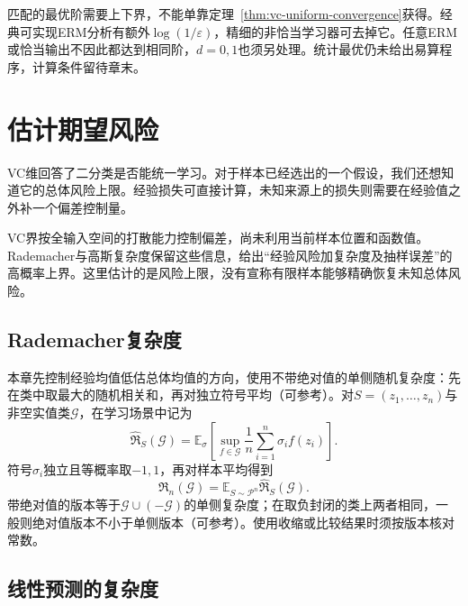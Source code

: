 匹配的最优阶需要上下界，不能单靠定理~\ref{thm:vc-uniform-convergence}获得。经典可实现ERM分析有额外$\log(1/\varepsilon)$，精细的非恰当学习器可去掉它。任意ERM或恰当输出不因此都达到相同阶，$d=0,1$也须另处理。统计最优仍未给出易算程序，计算条件留待章末。

\section{估计期望风险}
\label{sec:rademacher-complexity}

VC维回答了二分类是否能统一学习。对于样本已经选出的一个假设，我们还想知道它的总体风险上限。经验损失可直接计算，未知来源上的损失则需要在经验值之外补一个偏差控制量。

VC界按全输入空间的打散能力控制偏差，尚未利用当前样本位置和函数值。Rademacher与高斯复杂度保留这些信息，给出“经验风险加复杂度及抽样误差”的高概率上界。这里估计的是风险上限，没有宣称有限样本能够精确恢复未知总体风险。

\subsection{Rademacher复杂度}

本章先控制经验均值低估总体均值的方向，使用不带绝对值的单侧随机复杂度：先在类中取最大的随机相关和，再对独立符号平均（可参考）。对$S=(z_1,\ldots,z_n)$与非空实值类$\mathcal G$，在学习场景中记为
\begin{equation}
 \widehat{\mathfrak R}_S(\mathcal G)
 =\mathbb E_\sigma\left[\sup_{f\in\mathcal G}
       \frac1n\sum_{i=1}^n\sigma_i f(z_i)\right].
 \label{eq:learning-empirical-rademacher}
\end{equation}
符号$\sigma_i$独立且等概率取$-1,1$，再对样本平均得到
\[
 \mathfrak R_n(\mathcal G)=\mathbb E_{S\sim\mathcal P^n}
       \widehat{\mathfrak R}_S(\mathcal G).
\]
带绝对值的版本等于$\mathcal G\cup(-\mathcal G)$的单侧复杂度；在取负封闭的类上两者相同，一般则绝对值版本不小于单侧版本（可参考）。使用收缩或比较结果时须按版本核对常数。

\subsection{线性预测的复杂度}

